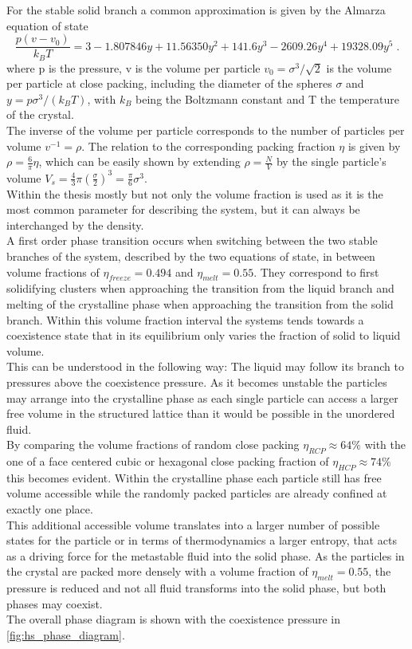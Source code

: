 For the stable solid branch a common approximation is given by the Almarza equation of state\cite{Almarza2009}
\begin{equation}
\frac{p(v-v_0)}{k_B T} = 3 - 1.807846 y + 11.56350 y^2 + 141.6 y^3 - 2609.26 y^4 + 19328.09 y^5 \; \text{.}
\end{equation}
where p is the pressure, v is the volume per particle $v_0=\sigma^3/\sqrt{2}$ is the volume per particle at close packing, including the diameter of the spheres $\sigma$ and $y=p \sigma^3 / (k_B T)$, with $k_B$ being the Boltzmann constant and T the temperature of the crystal.\\
The inverse of the volume per particle corresponds to the number of particles per volume $ v^{-1} = \rho$. The relation to the corresponding packing fraction $\eta$ is given by $\rho = \frac{6}{ \pi} \eta$, which can be easily shown by extending $\rho = \frac{N}{V}$ by the single particle's volume $V_s = \frac{4}{3} \pi \left(\frac{\sigma}{2}\right)^3 = \frac{\pi}{6} \sigma^3$.\\
Within the thesis mostly but not only the volume fraction is used as it is the most common parameter for describing the system, but it can always be interchanged by the density.\\ 

A first order phase transition occurs when switching between the two stable branches of the system, described by the two equations of state, in between volume fractions of $\eta_{freeze} = 0.494$ and $\eta_{melt}=0.55$. They correspond to first solidifying clusters when approaching the transition from the liquid branch and melting of the crystalline phase when approaching the transition from the solid branch. Within this volume fraction interval the systems tends towards a coexistence state that in its equilibrium only varies the fraction of solid to liquid volume.\\
This can be understood in the following way: The liquid may follow its branch to pressures above the coexistence pressure. As it becomes unstable the particles may arrange into the crystalline phase as each single particle can access a larger free volume in the structured lattice than it would be possible in the unordered fluid.\\
By comparing the volume fractions of random close packing $\eta_{RCP}\approx 64\%$ with the one of a face centered cubic or hexagonal close packing fraction of $\eta_{HCP} \approx 74 \%$ this becomes evident. Within the crystalline phase each particle still has free volume accessible while the randomly packed particles are already confined at exactly one place.\\
This additional accessible volume translates into a larger number of possible states for the particle or in terms of thermodynamics a larger entropy, that acts as a driving force for the metastable fluid into the solid phase. As the particles in the crystal are packed more densely with a volume fraction of $\eta_{melt}=0.55$, the pressure is reduced and not all fluid transforms into the solid phase, but both phases may coexist.\\
The overall phase diagram is shown with the coexistence pressure in \autoref{fig:hs_phase_diagram}.\\

